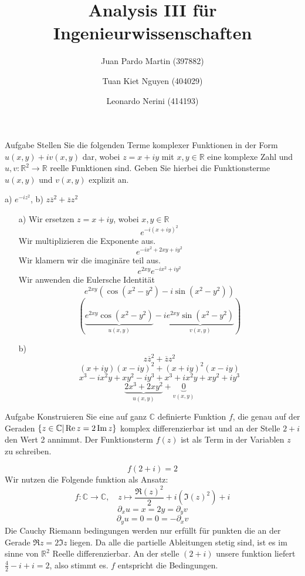 \documentclass{scrartcl}
\title{Analysis III für Ingenieurwissenschaften}
\author{Juan Pardo Martin (397882)\and Tuan Kiet Nguyen (404029)\and Leonardo Nerini (414193)}
\def\mbb#1{\mathbb{#1}}
\def\bC{\mbb{C}}
\def\bR{\mbb{R}}
\newcommand{\func}[3]{#1\colon#2\to#3}
\newcommand{\vfunc}[5]{\func{#1}{#2}{#3},\quad#4\longmapsto#5}
\begin{document}
\maketitle

\begin{section}{Aufgabe}%
Stellen Sie die folgenden Terme komplexer Funktionen in der Form \(u(x, y)+iv(x, y)\) dar,
wobei \(z = x + iy\) mit \(x, y \in \mathbb R\) eine komplexe Zahl und \(u, v : \mathbb R^2 \rightarrow \mathbb R\) reelle Funktionen
sind. Geben Sie hierbei die Funktionsterme \(u(x, y)\) und \(v(x, y)\) explizit an.
\begin{center}
a) \(e^{-i z^2}\),    b) \(z\overline{z}^2+\overline{z}z^2\)
\end{center}
\begin{itemize}
\item[a)]
Wir ersetzen \(z=x+iy\), wobei \(x,y\in \mathbb R\)
\[e^{-i (x+i y)^2}\]
Wir multiplizieren die Exponente aus.
\[e^{-i x^2+2 x y+i y^2}\]
Wir klamern wir die imaginäre teil aus.
\[e^{2 x y} e^{-i x^2+i y^2}\]
Wir anwenden die Eulersche Identität
\[e^{2 x y} \left(\cos \left(x^2-y^2\right)-i \sin \left(x^2-y^2\right)\right)\]
\[\left(\underbrace{e^{2 x y} \cos \left(x^2-y^2\right)}_{u(x,y)}-i \underbrace{e^{2 x y}\sin \left(x^2-y^2\right)}_{v(x,y)}\right)\]
\newpage
\item[b)]
\[z\overline{z}^2+\overline{z}z^2\]
\[(x+i y) (x-i y)^2+(x+i y)^2 (x-i y)\]
\[x^3-i x^2 y+x y^2-i y^3+x^3+i x^2 y+x y^2+i y^3\]
\[\underbrace{2 x^3 + 2 x y^2}_{u(x,y)}+\underbrace{0}_{v(x,y)}\]
\end{itemize}
\end{section}
\begin{section}{Aufgabe}%
Konstruieren Sie eine auf ganz $\bC$ definierte Funktion $f$, die genau auf der Geraden \(\qty{z \in
\mathbb C | \Re z = 2 \Im z}\) komplex differenzierbar ist 
und an der Stelle \(2 + i\) den Wert 2 annimmt. Der Funktionsterm 
$f(z)$ ist als Term in der Variablen $z$ zu schreiben.

\[f(2+i)=2\]
Wir nutzen die Folgende funktion als Ansatz:
\[\vfunc{f}{\bC}{\bC}{z}{\frac{\Re(z)^2}{2}+i(\Im(z)^2)}+i\]
\[\partial_x u = x = 2y = \partial_y v\]
\[\partial_y u = 0 = 0 = - \partial_x v\]
Die Cauchy Riemann bedingungen werden nur erfüllt für punkten die an der Gerade $ \Re z = 2 \Im z$ liegen.
Da alle die partielle Ableitungen stetig sind, ist es im sinne von $\bR^2$ Reelle differenzierbar.
An der stelle $(2+i)$ unsere funktion liefert $\frac{4}{2}-i+i=2$, also stimmt es.
$f$ entspricht die Bedingungen.


\end{section}
\end{document}
